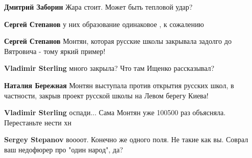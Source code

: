 \begin{itemize}
\begin{itemize}
\textbf{Дмитрий Заборин} Жара стоит. Может быть тепловой удар?

 
\textbf{Сергей Степанов} у них образование одинаковое , к сожалению

 
\textbf{Сергей Степанов} Монтян, которая русские школы закрывала задолго до Вятровича - тому яркий пример!

 
\textbf{Vladimir Sterling} много закрыла? Что там Ищенко рассказывал?

 
\textbf{Наталия Бережная} Монтян выступала против открытия русских школ, в частности, закрыв проект русской школы на Левом берегу Киева!

 
\textbf{Vladimir Sterling} оспади... Сама Монтян уже 100500 раз объясняла. Перестаньте нести хн

 
\textbf{Sergey Stepanov} воооот. Конечно же одного поля. Не такие как вы. Соврал ваш недофюрер про "один народ", да?


\end{itemize}
\end{itemize}
